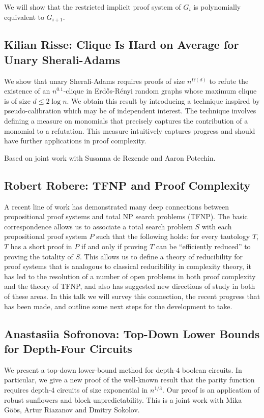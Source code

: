 \documentclass[11pt]{article}
\begin{document}
We will show that the restricted implicit proof system of $G_i$ is
polynomially equivalent to $G_{i+1}$.

\subsection*{Kilian Risse: Clique Is Hard on Average for Unary Sherali-Adams}\label{Risse}

We show that unary Sherali-Adams requires proofs of size $n^{\Omega(d)}$
to refute the existence of an $n^{0.1}$-clique in Erd\H{o}s-R\'{e}nyi
random graphs whose maximum clique is of size  $d\leq 2\log n$. We
obtain this result by introducing a technique inspired by
pseudo-calibration which may be of independent interest. The technique
involves defining a measure on monomials that precisely captures the
contribution of a monomial to a refutation. This measure intuitively
captures progress and should have further applications in proof complexity.

Based on joint work with Susanna de Rezende and Aaron Potechin.


\subsection*{Robert Robere: TFNP and Proof Complexity}\label{Robere}
A recent line of work has demonstrated many deep connections between propositional proof systems and total NP search problems (TFNP). The basic correspondence allows us to associate a total search problem $S$ with each propositional proof system $P$ such that the following holds: for every tautology $T$, $T$ has a short proof in $P$ if and only if proving $T$ can be “efficiently reduced” to proving the totality of $S$. This allows us to define a theory of reducibility for proof systems that is analogous to classical reducibility in complexity theory, it has led to the resolution of a number of open problems in both proof complexity and the theory of TFNP, and also has suggested new directions of study in both of these areas. In this talk we will survey this connection, the recent progress that has been made, and outline some next steps for the development to take.

\subsection*{Anastasiia Sofronova: Top-Down Lower Bounds for Depth-Four Circuits}\label{Sofronova}

We present a top-down lower-bound method for depth-$4$ boolean circuits. In particular, we give a new proof of the well-known result that the parity function requires depth-$4$ circuits of size exponential in $n^{1/3}$. Our proof is an application of robust sunflowers and block unpredictability.
This is a joint work with Mika Göös, Artur Riazanov and Dmitry Sokolov.
\end{document}
